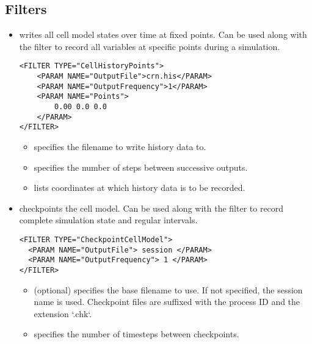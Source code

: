 \subsection{Filters}
\begin{itemize}
    \item {} writes all cell model states over time at
        fixed points. Can be used along with the  filter to
        record all variables at specific points during a simulation.
\begin{lstlisting}[style=XmlStyle]
<FILTER TYPE="CellHistoryPoints">
    <PARAM NAME="OutputFile">crn.his</PARAM>
    <PARAM NAME="OutputFrequency">1</PARAM>
    <PARAM NAME="Points">
        0.00 0.0 0.0
    </PARAM>
</FILTER>
\end{lstlisting}
    \begin{itemize}
        \item {} specifies the filename to write history data to.
        \item {} specifies the number of steps between successive outputs.
        \item {} lists coordinates at which history data is to be recorded.
    \end{itemize}

    \item {} checkpoints the cell model. Can be
    used along with the  filter to record complete simulation
    state and regular intervals.
\begin{lstlisting}[style=XmlStyle]
<FILTER TYPE="CheckpointCellModel">
  <PARAM NAME="OutputFile"> session </PARAM>
  <PARAM NAME="OutputFrequency"> 1 </PARAM>
</FILTER>
\end{lstlisting}
    \begin{itemize}
        \item {} (optional) specifies the base filename to use.
    If not specified, the session name is used. Checkpoint files are suffixed with the process ID and the extension `.chk`.
        \item {} specifies the number of timesteps between
    checkpoints.
    \end{itemize}
    

\end{itemize}
